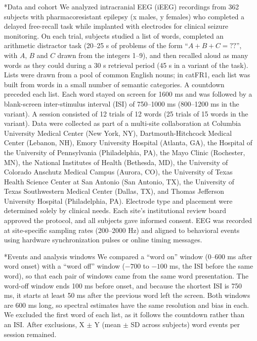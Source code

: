 \documentclass[10pt,twocolumn]{article}  %
\makeatletter
\renewcommand\subsection{\@startsection{subsection}{2}{\z@}{-8pt plus -2pt minus -1pt}{2pt}{\raggedright\sffamily\bfseries\normalsize}}
\makeatother
\begin{document}
\subsection*{Data and cohort}\label{data-and-cohort}
We analyzed intracranial EEG (iEEG) recordings from 362 subjects with pharmacoresistant epilepsy (x males, y females) who completed a delayed free-recall task while implanted with electrodes for clinical seizure monitoring. On each trial, subjects studied a list of words, completed an arithmetic distractor task (20--25 s of problems of the form ``$A + B + C = ??$'', with $A$, $B$ and $C$ drawn from the integers 1--9), and then recalled aloud as many words as they could during a 30 s retrieval period (45 s in a variant of the task). Lists were drawn from a pool of common English nouns; in catFR1, each list was built from words in a small number of semantic categories. A countdown preceded each list. Each word stayed on screen for 1600 ms and was followed by a blank-screen inter-stimulus interval (ISI) of 750--1000 ms (800--1200 ms in the variant). A session consisted of 12 trials of 12 words (25 trials of 15 words in the variant). Data were collected as part of a multi-site collaboration at Columbia University Medical Center (New York, NY), Dartmouth-Hitchcock Medical Center (Lebanon, NH), Emory University Hospital (Atlanta, GA), the Hospital of the University of Pennsylvania (Philadelphia, PA), the Mayo Clinic (Rochester, MN), the National Institutes of Health (Bethesda, MD), the University of Colorado Anschutz Medical Campus (Aurora, CO), the University of Texas Health Science Center at San Antonio (San Antonio, TX), the University of Texas Southwestern Medical Center (Dallas, TX), and Thomas Jefferson University Hospital (Philadelphia, PA). Electrode type and placement were determined solely by clinical needs. Each site's institutional review board approved the protocol, and all subjects gave informed consent. EEG was recorded at site-specific sampling rates (200--2000 Hz) and aligned to behavioral events using hardware synchronization pulses or online timing messages.

\subsection*{Events and analysis windows}\label{events}
We compared a ``word on'' window (0--600 ms after word onset) with a ``word off'' window ($-700$ to $-100$ ms, the ISI before the same word), so that each pair of windows came from the same word presentation. The word-off window ends 100 ms before onset, and because the shortest ISI is 750 ms, it starts at least 50 ms after the previous word left the screen. Both windows are 600 ms long, so spectral estimates have the same resolution and bias in each. We excluded the first word of each list, as it follows the countdown rather than an ISI. After exclusions, X $\pm$ Y (mean $\pm$ SD across subjects) word events per session remained.
\end{document}
